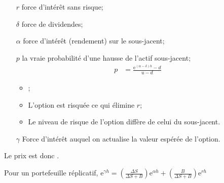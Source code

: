 \documentclass[10pt, french]{article}
\begin{document}
\begin{multicols*}{2}
\begin{distributions}[Notation]
\begin{itemize}[leftmargin = *]
	\item[$r$]	force d'intérêt sans risque;
	\item[$\delta$]	force de dividendes;
	\item[$\alpha$]	force d'intérêt (rendement) sur le sous-jacent;
	\item[$p$]	la vraie probabilité d'une hausse de l'actif sous-jacent;
		\begin{align*}
		p	&=	\frac{\textrm{e}^{(\alpha - \delta)h} - d}{u - d}
		\end{align*}
		\begin{itemize}
		\item	{};
		\item	L'option est risquée ce qui élimine $r$;
		\item	Le niveau de risque de l'option diffère de celui du sous-jacent.
		\end{itemize}
	\item[$\gamma$]	Force d'intérêt auquel on actualise la valeur espérée de l'option.
\end{itemize}
Le prix est donc .
\end{distributions}

Pour un portefeuille réplicatif, $\textrm{e}^{\gamma h}	=	\left(	\frac{\Delta S}{\Delta S + B}\right)\textrm{e}^{\alpha h} + \left(\frac{B}{\Delta S + B}\right)\textrm{e}^{r h}$


\end{multicols*}
\end{document}
